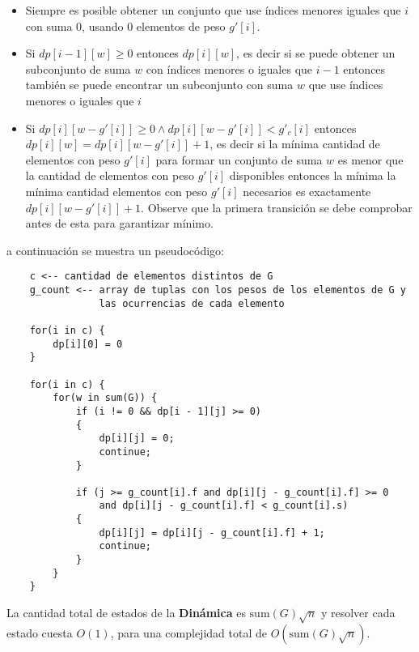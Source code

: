 \documentclass{article}
\begin{document}
\begin{itemize}
    \item Siempre es posible obtener un conjunto que use índices menores iguales que $i$ con suma 0, usando 0 elementos de peso $g'[i]$.
    \item Si $dp[i-1][w]\geq 0$ entonces $dp[i][w]$, es decir si se puede obtener un subconjunto de suma
          $w$ con índices menores o iguales que $i-1$ entonces también se puede encontrar un subconjunto con suma $w$ que use
          índices menores o iguales que $i$
    \item Si $dp[i][w - g'[i]] \geq 0 \wedge dp[i][w - g'[i]] < g'_c[i]$ entonces $dp[i][w]= dp[i][w - g'[i]]+1$, es decir
          si la mínima cantidad de elementos con peso $g'[i]$ para formar un conjunto de suma $w$ es menor que la cantidad
          de elementos con peso $g'[i]$ disponibles entonces la mínima la mínima cantidad elementos con peso $g'[i]$ necesarios
          es exactamente $dp[i][w - g'[i]]+1$. Observe que la primera transición se debe comprobar antes de esta para garantizar
          mínimo.
\end{itemize}
a continuación se muestra un pseudocódigo:

\begin{verbatim}
    c <-- cantidad de elementos distintos de G
    g_count <-- array de tuplas con los pesos de los elementos de G y 
                las ocurrencias de cada elemento

    for(i in c) {
        dp[i][0] = 0
    }

    for(i in c) { 
        for(w in sum(G)) {
            if (i != 0 && dp[i - 1][j] >= 0)
            {
                dp[i][j] = 0;
                continue;
            }

            if (j >= g_count[i].f and dp[i][j - g_count[i].f] >= 0 
                and dp[i][j - g_count[i].f] < g_count[i].s)
            {
                dp[i][j] = dp[i][j - g_count[i].f] + 1;
                continue;
            }
        }
    }
\end{verbatim}
La cantidad total de estados de la \textbf{Dinámica} es $\text{sum}(G)\sqrt{n}$ y resolver cada estado cuesta $O(1)$, para
una complejidad total de $O(\text{sum}(G)\sqrt{n})$.
\end{document}
